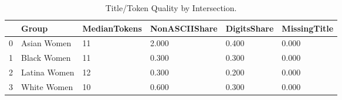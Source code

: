 \begin{table}[htbp]
\centering
\caption{Title/Token Quality by Intersection.}
\label{tab:eda_title_quality_by_group}
\begin{tabular}{llllll}
\toprule
 & Group & MedianTokens & NonASCIIShare & DigitsShare & MissingTitle \\
\midrule
0 & Asian Women & 11 & 2.000 & 0.400 & 0.000 \\
1 & Black Women & 11 & 0.300 & 0.300 & 0.000 \\
2 & Latina Women & 12 & 0.300 & 0.200 & 0.000 \\
3 & White Women & 10 & 0.600 & 0.300 & 0.000 \\
\bottomrule
\end{tabular}

\end{table}